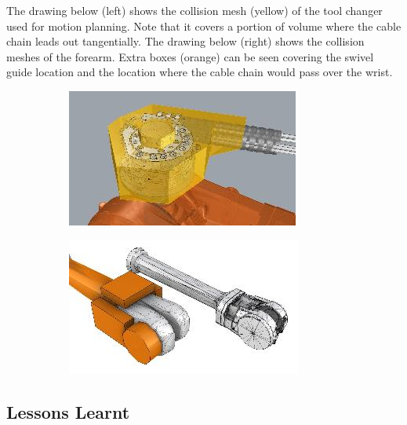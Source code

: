 \documentclass[11pt]{book}
\begin{document}
The drawing below (left) shows the collision mesh (yellow) of the tool changer used for motion planning. Note that it covers a portion of volume where the cable chain leads out tangentially. The drawing below (right) shows the collision meshes of the forearm. Extra boxes (orange) can be seen covering the swivel guide location and the location where the cable chain would pass over the wrist.

\begin{figure}[H]
\centering
\begin{subfigure}[b]{0.45\textwidth}
\centering
\includegraphics[width=\textwidth]{./images/image9.jpeg}
\end{subfigure}
\hfill
\begin{subfigure}[b]{0.45\textwidth}
\centering
\includegraphics[width=\textwidth]{./images/image10.jpeg}
\end{subfigure}
\end{figure}


\subsection{Lessons Learnt}
\end{document}
